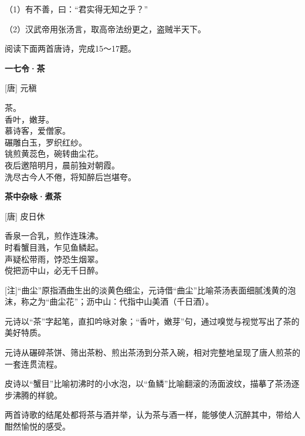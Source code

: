 \documentclass[11pt,a4paper]{ctexart}
\begin{document}

（1）有不善，曰：“君实得无知之乎？”

（2）汉武帝用张汤言，取高帝法纷更之，盗贼半天下。


\par\vspace{2.2em}

阅读下面两首唐诗，完成15～17题。

\begin{center}{\bfseries 一七令·茶}\par\vspace{0.15em}[唐] 元稹\end{center}

\begin{center}
\ywstkaiti
茶。\\
香叶，嫩芽。\\
慕诗客，爱僧家。\\
碾雕白玉，罗织红纱。\\
铫煎黄蕊色，碗转曲尘花。\\
夜后邀陪明月，晨前独对朝霞。\\
洗尽古今人不倦，将知醉后岂堪夸。
\end{center}

\begin{center}{\bfseries 茶中杂咏·煮茶}\par\vspace{0.15em}[唐] 皮日休\end{center}

\begin{center}
\ywstkaiti
香泉一合乳，煎作连珠沸。\\
时看蟹目溅，乍见鱼鳞起。\\
声疑松带雨，饽恐生烟翠。\\
傥把沥中山，必无千日醉。
\end{center}

[注]“曲尘”原指酒曲生出的淡黄色细尘，元诗借“曲尘”比喻茶汤表面细腻浅黄的泡沫，称之为“曲尘花”；沥中山：代指中山美酒（千日酒）。

\begin{choices}
\item 元诗以“茶”字起笔，直扣吟咏对象；“香叶，嫩芽”句，通过嗅觉与视觉写出了茶的美好特质。
\item 元诗从碾碎茶饼、筛出茶粉、煎出茶汤到分茶入碗，相对完整地呈现了唐人煎茶的一套连贯流程。
\item 皮诗以“蟹目”比喻初沸时的小水泡，以“鱼鳞”比喻翻滚的汤面波纹，描摹了茶汤逐步沸腾的样貌。
\item 两首诗歌的结尾处都将茶与酒并举，认为茶与酒一样，能够使人沉醉其中，带给人酣然愉悦的感受。
\end{choices}
\end{document}
